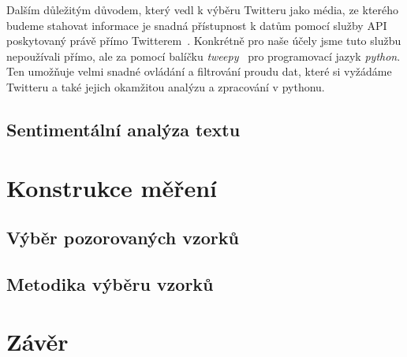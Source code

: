 \documentclass[12pt, a4paper]{article}
\numberwithin{equation}{section} 	%
\begin{document}
Dalším důležitým důvodem, který vedl k výběru Twitteru jako média, ze kterého budeme stahovat informace je snadná přístupnost k datům pomocí služby API poskytovaný právě přímo Twitterem~\cite{twitterAPI}. Konkrétně pro naše účely jsme tuto službu nepoužívali přímo, ale za pomocí balíčku \textit{tweepy}~\cite{tweepy} pro programovací jazyk \textit{python}. Ten umožňuje velmi snadné ovládání a filtrování proudu dat, které si vyžádáme Twitteru a také jejich okamžitou analýzu a zpracování v pythonu.

\subsection{Sentimentální analýza textu}
\noindent


\newpage
\section{Konstrukce měření}
\subsection{Výběr pozorovaných vzorků}
\subsection{Metodika výběru vzorků}





\newpage
\section{Závěr}
\noindent
\end{document}
